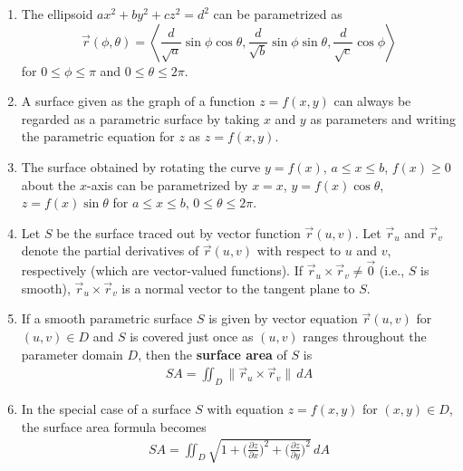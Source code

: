 \documentclass[10pt]{article}
\begin{document}
\begin{multicols*}{2}
\begin{enumerate}
\begin{enumerate}
        \item The ellipsoid $ax^2 + by^2 + cz^2 = d^2$ can be parametrized as $$\vec{r}(\phi, \theta) = \left< \frac{d}{\sqrt{a}}\sin{\phi}\cos{\theta}, \frac{d}{\sqrt{b}}\sin{\phi}\sin{\theta}, \frac{d}{\sqrt{c}}\cos{\phi} \right>$$ for $0 \leq \phi \leq \pi$ and $0 \leq \theta \leq 2\pi$.
        \item A surface given as the graph of a function $z=f(x,y)$ can always be regarded as a parametric surface by taking $x$ and $y$ as parameters and writing the parametric equation for $z$ as $z=f(x,y)$.
        \item The surface obtained by rotating the curve $y=f(x)$, $a \leq x \leq b$, $f(x) \geq 0$ about the $x$-axis can be parametrized by $x=x$, $y=f(x)\cos{\theta}$, $z=f(x)\sin{\theta}$ for $a \leq x \leq b$, $0 \leq \theta \leq 2\pi$.
        \item Let $S$ be the surface traced out by vector function $\vec{r}(u,v)$. Let $\vec{r}_u$ and $\vec{r}_v$ denote the partial derivatives of $\vec{r}(u,v)$ with respect to $u$ and $v$, respectively (which are vector-valued functions). If $\vec{r}_u \times \vec{r}_v \neq \vec{0}$ (i.e., $S$ is smooth), $\vec{r}_u \times \vec{r}_v$ is a normal vector to the tangent plane to $S$.
        \item If a smooth parametric surface $S$ is given by vector equation $\vec{r}(u,v)$ for $(u,v) \in D$ and $S$ is covered just once as $(u,v)$ ranges throughout the parameter domain $D$, then the \textbf{surface area} of $S$ is
        \begin{align*}
            SA = \iint_D \| \vec{r}_u \times \vec{r}_v \| \,dA
        \end{align*}
        \item In the special case of a surface $S$ with equation $z=f(x,y)$ for $(x,y) \in D$, the surface area formula becomes
        \begin{align*}
            SA = \iint_D \sqrt{1 + \biggl( \frac{\partial z}{\partial x} \biggr)^2 + \biggl( \frac{\partial z}{\partial y} \biggr)^2} \,dA
        \end{align*}
    \end{enumerate}
    

\end{enumerate}
\end{multicols*}
\end{document}
